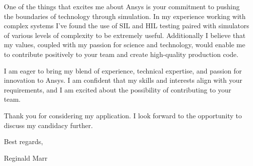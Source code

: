 \documentclass[a4paper,ragged2e,withhyper]{altacv}
\begin{document}
\begin{fullwidth}
\vspace{0.5cm}

\noindent
One of the things that excites me about Ansys is your commitment to pushing the boundaries of technology through simulation.
In my experience working with complex systems I've found the use of SIL and HIL testing paired with simulators of various levels of complexity to be extremely useful. Additionally I believe that my values, coupled with my passion for science and technology, would enable me to contribute positively to your team and create high-quality production code.

\vspace{0.5cm}

\noindent
I am eager to bring my blend of experience, technical expertise, and passion for innovation to Ansys. I am confident that my skills and interests align with your requirements, and I am excited about the possibility of contributing to your team.

\vspace{0.5cm}

\noindent
Thank you for considering my application. I look forward to the opportunity to discuss my candidacy further.

\vspace{0.5cm}

\noindent
Best regards,

\vspace{0.2cm}

\noindent
Reginald Marr

\end{fullwidth}
\end{document}
